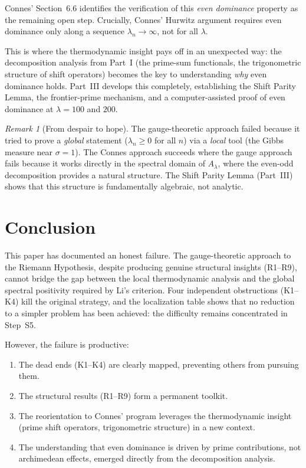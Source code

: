 \documentclass[12pt,a4paper]{article}
\theoremstyle{definition}
\theoremstyle{remark}
\newtheorem{remark}[theorem]{Remark}
\begin{document}
Connes' Section~6.6 identifies the verification of this \emph{even dominance} property as the remaining open step. Crucially, Connes' Hurwitz argument requires even dominance only along a sequence $\lambda_n \to \infty$, not for all $\lambda$.

This is where the thermodynamic insight pays off in an unexpected way: the decomposition analysis from Part~I (the prime-sum functionals, the trigonometric structure of shift operators) becomes the key to understanding \emph{why} even dominance holds. Part~III develops this completely, establishing the Shift Parity Lemma, the frontier-prime mechanism, and a computer-assisted proof of even dominance at $\lambda = 100$ and $200$.

\begin{remark}[From despair to hope]
The gauge-theoretic approach failed because it tried to prove a \emph{global} statement ($\lambda_n \geq 0$ for all $n$) via a \emph{local} tool (the Gibbs measure near $\sigma = 1$). The Connes approach succeeds where the gauge approach fails because it works directly in the spectral domain of $A_\lambda$, where the even-odd decomposition provides a natural structure. The Shift Parity Lemma (Part~III) shows that this structure is fundamentally algebraic, not analytic.
\end{remark}


\section{Conclusion}
\label{sec:conclusion}

This paper has documented an honest failure. The gauge-theoretic approach to the Riemann Hypothesis, despite producing genuine structural insights (R1--R9), cannot bridge the gap between the local thermodynamic analysis and the global spectral positivity required by Li's criterion. Four independent obstructions (K1--K4) kill the original strategy, and the localization table shows that no reduction to a simpler problem has been achieved: the difficulty remains concentrated in Step~S5.

However, the failure is productive:
\begin{enumerate}
  \item The dead ends (K1--K4) are clearly mapped, preventing others from pursuing them.
  \item The structural results (R1--R9) form a permanent toolkit.
  \item The reorientation to Connes' program leverages the thermodynamic insight (prime shift operators, trigonometric structure) in a new context.
  \item The understanding that even dominance is driven by prime contributions, not archimedean effects, emerged directly from the decomposition analysis.
\end{enumerate}
\end{document}
